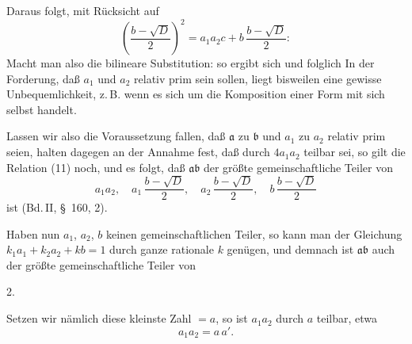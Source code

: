 Daraus folgt, mit Rücksicht auf
\[
\left(\frac{b-\sqrt D}{2}\right)^2 = a_1 a_2 c + b\,\frac{b-\sqrt D}{2}:
\]
Macht man also die bilineare Substitution:
so ergibt sich
und folglich
In der Forderung, daß $a_1$ und $a_2$ relativ prim sein sollen, liegt bisweilen eine gewisse Unbequemlichkeit, z.\,B. wenn es sich um die Komposition einer Form mit sich selbst handelt.

Lassen wir also die Voraussetzung fallen, daß $\mathfrak{a}$ zu $\mathfrak{b}$ und $a_1$ zu $a_2$ relativ prim seien, halten dagegen an der Annahme fest, daß
durch $4 a_1 a_2$ teilbar sei, so gilt die Relation (11) noch, und es folgt, daß $\mathfrak{a}\mathfrak{b}$ der größte gemeinschaftliche Teiler von
\[
a_1 a_2, \quad a_1\,\frac{b-\sqrt D}{2}, \quad a_2\,\frac{b-\sqrt D}{2}, \quad b\,\frac{b-\sqrt D}{2}
\]
ist (Bd.\,II, §~160, 2).

Haben nun $a_1$, $a_2$, $b$ keinen gemeinschaftlichen Teiler, so kann man der Gleichung $k_1 a_1 + k_2 a_2 + kb = 1$ durch ganze rationale $k$ genügen, und demnach ist $\mathfrak{a}\mathfrak{b}$ auch der größte gemeinschaftliche Teiler von

2. 

Setzen wir nämlich diese kleinste Zahl $=a$, so ist $a_1 a_2$ durch $a$ teilbar, etwa
\[
a_1 a_2 = a\,a'.
\]
